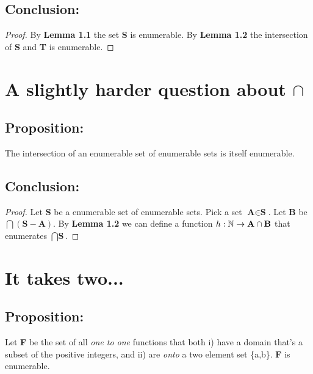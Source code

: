 \documentclass[a4paper,11pt]{article}
\begin{document}
	\subsection*{Conclusion:}
	\begin{proof}
	By \textbf{Lemma 1.1} the set \textbf{S} is enumerable.  By \textbf{Lemma 1.2} the intersection
	of \textbf{S} and \textbf{T} is enumerable.
	\end{proof}
		
\pagebreak


\section{A slightly harder question about $\cap$}

	\subsection*{Proposition:}
	The intersection of an enumerable set of enumerable sets is itself enumerable.

	\bigskip
	
	\subsection*{Conclusion:}
	\begin{proof}
	Let \textbf{S} be a enumerable set of enumerable sets. Pick a set $\textbf{A} \in \textbf{S}$. Let
	\textbf{B} be $\bigcap (\textbf{S} - \textbf{A})$. By \textbf{Lemma 1.2} we can define a function 
	$\mathnormal{h}: \mathbb{N} \rightarrow \textbf{A} \cap \textbf{B}$ that enumerates $\bigcap \textbf{S}$.	
	\end{proof}
	
\bigskip


\section{It takes two...}

	\subsection*{Proposition:}
	Let \textbf{F} be the set of all \textit{one to one} functions that both i) have a domain that's a subset of the positive
	integers, and ii) are \textit{onto} a two element set \{a,b\}. \textbf{F} is enumerable.
	
\end{document}
